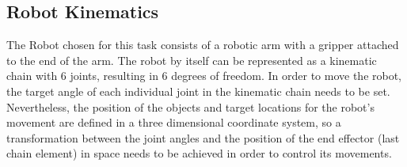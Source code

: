 





\subsection{Robot Kinematics}


The Robot chosen for this task consists of a robotic arm with a gripper attached to the end of the arm. The robot by itself can be represented as a kinematic chain with 6 joints, resulting in 6 degrees of freedom.
In order to move the robot, the target angle of each individual joint in the kinematic chain needs to be set. Nevertheless, the position of the objects and target locations for the robot's movement are defined in a three dimensional coordinate system, so a transformation between the joint angles and the position of the end effector (last chain element) in space needs to be achieved in order to control its movements.

